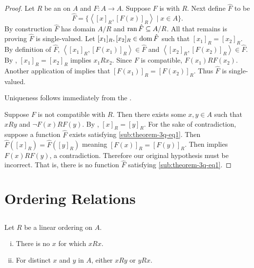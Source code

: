 \documentclass{report}
\newcommand{\pair}[1]{\left< #1 \right>}
\begin{document}
\begin{proof}

  Let $R$ be an  on $A$ and
    $F \colon A \rightarrow A$.
  Suppose $F$ is  with $R$.
  Next define  $\hat{F}$ to be
    $$\hat{F} = \{\pair{[x]_R, [F(x)]_R} \mid x \in A\}.$$
  By construction $\hat{F}$ has domain $A / R$ and
    $\mathop{\text{ran}}{\hat{F}} \subseteq A / R$.
  All that remains is proving $\hat{F}$ is single-valued.
  Let $[x_1]_R, [x_2]_R \in \mathop{\text{dom}}{\hat{F}}$ such that $[x_1]_R = [x_2]_R$.
  By definition of $\hat{F}$, $\pair{[x_1]_R, [F(x_1)]_R} \in \hat{F}$
    and $\pair{[x_2]_R, [F(x_2)]_R} \in \hat{F}$.
  By , $[x_1]_R = [x_2]_R$ implies $x_1Rx_2$.
  Since $F$ is compatible, $F(x_1)RF(x_2)$.
  Another application of  implies that
    $[F(x_1)]_R = [F(x_2)]_R$.
  Thus $\hat{F}$ is single-valued.

  Uniqueness follows immediately from the .

  \suitdivider

  Suppose $F$ is not compatible with $R$.
  Then there exists some $x, y \in A$ such that $xRy$ and $\neg F(x)RF(y)$.
  By , $[x]_R = [y]_R$.
  For the sake of contradiction, suppose a function $\hat{F}$ exists satisfying
    \eqref{sub:theorem-3q-eq1}.
  Then $\hat{F}([x]_R) = \hat{F}([y]_R)$ meaning $[F(x)]_R = [F(y)]_R$.
  Then  implies $F(x)RF(y)$, a contradiction.
  Therefore our original hypothesis must be incorrect.
  That is, there is no function $\hat{F}$ satisfying \eqref{sub:theorem-3q-eq1}.

\end{proof}

\section{Ordering Relations}%

\subsection{}%

\begin{theorem}[3R]

  Let $R$ be a linear ordering on $A$.
  \begin{enumerate}[(i)]
    \item There is no $x$ for which $xRx$.
    \item For distinct $x$ and $y$ in $A$, either $xRy$ or $yRx$.
  \end{enumerate}

\end{theorem}
\end{document}
